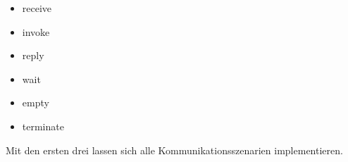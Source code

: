 
\begin{itemize}
	\item receive
	\item invoke
	\item reply
	\item wait
	\item empty
	\item terminate
\end{itemize}
Mit den ersten drei lassen sich alle Kommunikationsszenarien implementieren.